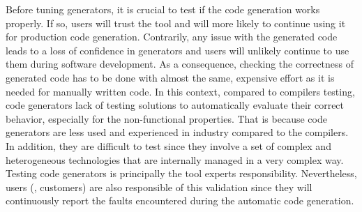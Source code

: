 
Before tuning generators, it is crucial to test if the code generation works properly. If so, users will trust the tool and will more likely to continue using it for production code generation. Contrarily, any issue with the generated code leads to a loss of confidence in generators and users will unlikely continue to use them during software development. As a consequence, checking the correctness of generated code has to be done with almost the same, expensive effort as it is needed for manually written code.
In this context, compared to compilers testing\cite{yang2011finding,le2014compiler}, code generators lack of testing solutions to automatically evaluate their correct behavior, especially for the non-functional properties.
That is because code generators are less used and experienced in industry compared to the compilers. In addition, they are difficult to test since they involve a set of complex and heterogeneous technologies that are internally managed in a very complex way\cite{guana2015developers,guana2014chaintracker}.
Testing code generators is principally the tool experts responsibility. Nevertheless, users (\eg, customers) are also responsible of this validation since they will continuously report the faults encountered during the automatic code generation. 
